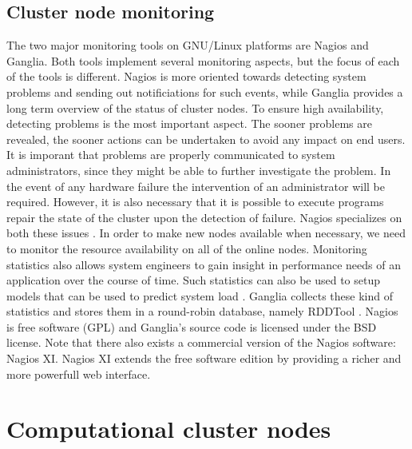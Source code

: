 \documentclass[12pt]{report}
\begin{document}
\subsection{Cluster node monitoring}
The two major monitoring tools on GNU/Linux platforms are Nagios and
Ganglia. Both tools implement several monitoring aspects, but the
focus of each of the tools is different. Nagios is more oriented
towards detecting system problems and sending out notificiations for
such events, while Ganglia provides a long term overview of the status
of cluster nodes. To ensure high availability, detecting problems is
the most important aspect. The sooner problems are revealed, the
sooner actions can be undertaken to avoid any impact on end users. It
is imporant that problems are properly communicated to system
administrators, since they might be able to further investigate the
problem. In the event of any hardware failure the intervention of
an administrator will be required. However, it is also necessary that
 it is possible to execute programs repair the state of the cluster
 upon the detection of failure. Nagios specializes on both these
 issues \cite{nagios:2013}.
In order to make new nodes available when necessary, we need to
monitor the resource availability on all of the online nodes.
Monitoring statistics also allows system engineers to gain insight in
performance needs of an application over the course of time. 
Such statistics can also be used to setup models that can be used to
predict system load \cite{andreolini:2006}. Ganglia collects these
kind of statistics and stores them in a round-robin database, namely RDDTool
\cite{ganglia:2013} \cite{rrdt:2013}.
Nagios is free software (GPL) and Ganglia's source code is licensed
under the BSD license. Note that there also exists a commercial
version of the Nagios software: Nagios XI. Nagios XI extends the free
software edition by providing a richer and more powerfull web interface.

\section{Computational cluster nodes}
\end{document}
